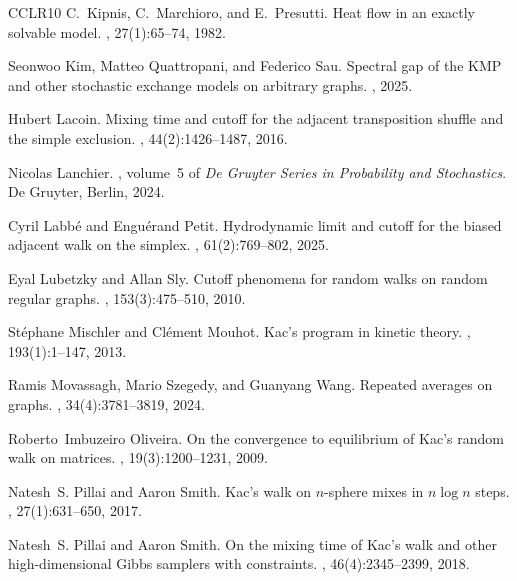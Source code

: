 \documentclass[11pt,reqno]{amsart}
\theoremstyle{remark}
\theoremstyle{definition}
\numberwithin{equation}{section}
\numberwithin{figure}{section}
\begin{document}
\begin{thebibliography}{CCLR{\etalchar{+}}10}
	C.~Kipnis, C.~Marchioro, and E.~Presutti.
	\newblock Heat flow in an exactly solvable model.
	, 27(1):65--74, 1982.
	
	Seonwoo Kim, Matteo Quattropani, and Federico Sau.
	\newblock Spectral gap of the {KMP} and other stochastic exchange models on
	arbitrary graphs.
	, 2025.
	
	Hubert Lacoin.
	\newblock Mixing time and cutoff for the adjacent transposition shuffle and the
	simple exclusion.
	, 44(2):1426--1487, 2016.
	
	Nicolas Lanchier.
	,
	volume~5 of {\em De Gruyter Series in Probability and Stochastics}.
	\newblock De Gruyter, Berlin, 2024.
	
	Cyril Labb{\'e} and Engu{\'e}rand Petit.
	\newblock Hydrodynamic limit and cutoff for the biased adjacent walk on the
	simplex.
	, 61(2):769--802,
	2025.
	
	Eyal Lubetzky and Allan Sly.
	\newblock Cutoff phenomena for random walks on random regular graphs.
	, 153(3):475--510, 2010.
	
	St\'ephane Mischler and Cl\'ement Mouhot.
	\newblock Kac's program in kinetic theory.
	, 193(1):1--147, 2013.
	
	Ramis Movassagh, Mario Szegedy, and Guanyang Wang.
	\newblock Repeated averages on graphs.
	, 34(4):3781--3819, 2024.
	
	Roberto~Imbuzeiro Oliveira.
	\newblock On the convergence to equilibrium of {K}ac's random walk on matrices.
	, 19(3):1200--1231, 2009.
	
	Natesh~S. Pillai and Aaron Smith.
	\newblock Kac's walk on {$n$}-sphere mixes in {$n\log n$} steps.
	, 27(1):631--650, 2017.
	
	Natesh~S. Pillai and Aaron Smith.
	\newblock On the mixing time of {K}ac's walk and other high-dimensional {G}ibbs
	samplers with constraints.
	, 46(4):2345--2399, 2018.
	

\end{thebibliography}
\end{document}
